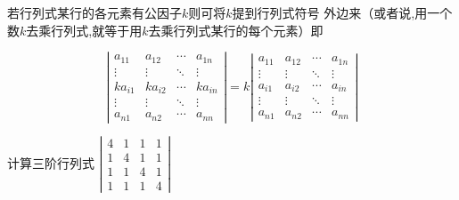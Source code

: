 \begin{property}
    若行列式某行的各元素有公因子$k$则可将$k$提到行列式符号
    外边来（或者说,用一个数$k$去乘行列式,就等于用$k$去乘行列式某行的每个元素）即

    $$\left|\begin{array}{ccccc}
            a_{11}  & a_{12}  & \cdots & a_{1n}  \\
            \vdots  & \vdots  & \ddots & \vdots  \\
            ka_{i1} & ka_{i2} & \cdots & ka_{in} \\
            \vdots  & \vdots  & \ddots & \vdots  \\
            a_{n1}  & a_{n2}  & \cdots & a_{nn}
        \end{array}\right| =  k \left|\begin{array}{ccccc}
            a_{11} & a_{12} & \cdots & a_{1n} \\
            \vdots & \vdots & \ddots & \vdots \\
            a_{i1} & a_{i2} & \cdots & a_{in} \\
            \vdots & \vdots & \ddots & \vdots \\
            a_{n1} & a_{n2} & \cdots & a_{nn}
        \end{array}\right|  $$
\end{property}

\begin{example}
    计算三阶行列式
    $ \left|\begin{array}{cccc}
            4 & 1 & 1 & 1 \\
            1 & 4 & 1 & 1 \\
            1 & 1 & 4 & 1 \\
            1 & 1 & 1 & 4
        \end{array}\right| $
\end{example}

